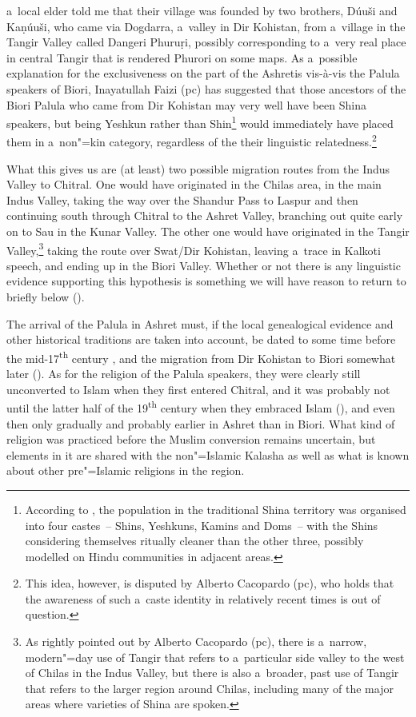 a~local elder told me that their village was founded by two brothers, Dúuši‌ and ‌Kaṇúuši, who came
via Dogdarra, a~valley in Dir Kohistan, from a~village in the Tangir Valley called Dangeri Phuruṛi,
possibly corresponding to a~very real place in central Tangir that is rendered Phurori on some
maps. As a~possible explanation for the exclusiveness on the part of the Ashretis vis-à-vis the
Palula speakers of Biori, Inayatullah Faizi (pc) has suggested that those ancestors of the Biori
Palula who came from Dir Kohistan may very well have been Shina speakers, but being Yeshkun rather
than Shin\footnote{According to \citet[17]{jettmar2002}, the population in the traditional Shina
  territory was organised into four castes~-- Shins, Yeshkuns, Kamins and Doms~-- with the Shins
  considering themselves ritually cleaner than the other three, possibly modelled on Hindu
  communities in adjacent areas. } would immediately have placed them in a~non"=kin category,
regardless of the their linguistic relatedness.\footnote{This idea, however, is disputed by Alberto
  Cacopardo (pc), who holds that the awareness of such a~caste identity in relatively recent times
  is out of question.}


What this gives us are (at least) two possible migration routes from the Indus Valley to
Chitral. One would have originated in the Chilas area, in the main Indus Valley, taking the way over
the Shandur Pass to Laspur and then continuing south through Chitral to the Ashret Valley, branching
out quite early on to Sau in the Kunar Valley. The other one would have originated in the Tangir
Valley,\footnote{As rightly pointed out by Alberto Cacopardo (pc), there is a~narrow, modern"=day use
  of Tangir that refers to a~particular side valley to the west of Chilas in the Indus Valley, but
  there is also a~broader, past use of Tangir that refers to the larger region around Chilas,
  including many of the major areas where varieties of Shina are spoken.} taking the route over
Swat/Dir Kohistan, leaving a~trace in Kalkoti speech, and ending up in the Biori Valley. Whether or
not there is any linguistic evidence supporting this hypothesis is something we will have reason to
return to briefly below ().


The arrival of the Palula in Ashret must, if the local genealogical evidence and other historical
traditions are taken into account, be dated to some time before the mid-17\textsuperscript{th}
century \citep[88]{cacopardo2001}, and the migration from Dir Kohistan to Biori somewhat later
(\citeyear[118]{cacopardo2001}). As for the religion of the Palula speakers, they were clearly still
unconverted to Islam when they first entered Chitral, and it was probably not until the latter half
of the 19\textsuperscript{th} century when they embraced Islam (\citeyear[83]{cacopardo2001}), and
even then only gradually and probably earlier in Ashret than in Biori. What kind of religion was
practiced before the Muslim conversion remains uncertain, but elements in it are shared with the
non"=Islamic Kalasha as well as what is known about other pre"=Islamic religions in the region.


